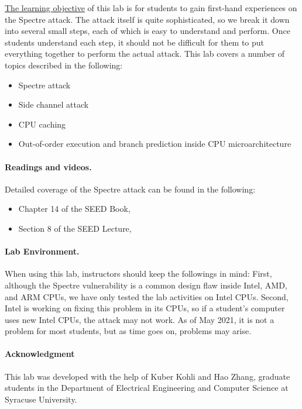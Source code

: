 \underline{The learning objective} of this lab is for students to gain first-hand
experiences on the Spectre attack. The attack itself is quite
sophisticated, so we break it down into several small steps, each of which
is easy to understand and perform.  Once students understand each step, it
should not be difficult for them to put everything together to perform the
actual attack. This lab covers a number of topics
described in the following:

\begin{itemize}[noitemsep]
\item Spectre attack
\item Side channel attack
\item CPU caching
\item Out-of-order execution and branch prediction  
      inside CPU microarchitecture
\end{itemize}



\paragraph{Readings and videos.}
Detailed coverage of the Spectre attack can be found in the following:

\begin{itemize}
\item Chapter 14 of the SEED Book, \seedbook
\item Section 8 of the SEED Lecture, \seedcsvideo
\end{itemize}


\paragraph{Lab Environment.} \seedenvironmentAB

When using this lab, instructors should keep the followings in mind:
First, although the Spectre vulnerability
is a common design flaw inside Intel, AMD, and ARM CPUs, we have
only tested the lab activities on Intel CPUs.
Second, Intel is working on fixing this
problem in its CPUs, so if a student's computer uses new Intel CPUs, the
attack may not work. As of May 2021, it is not a problem for most students,
but as time goes on, problems may arise. 


\paragraph{Acknowledgment} This lab was developed with the help of 
Kuber Kohli and Hao Zhang,
graduate students in the Department of
Electrical Engineering and Computer Science at Syracuse University.




